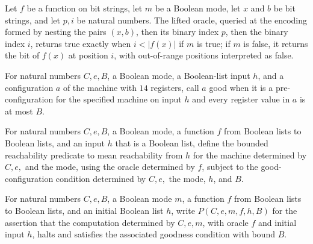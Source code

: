\begin{lemma}
\label{Complexity.comp_lifted}
\leanok
{}
Let $f$ be a function on bit strings, let $m$ be a Boolean mode, let $x$ and $b$ be bit
strings, and let $p,i$ be natural numbers. The lifted oracle, queried at the encoding
formed by nesting the pairs $(x,b)$, then its binary index $p$, then the binary index
$i$, returns true exactly when $i<|f(x)|$ if $m$ is true; if $m$ is false, it returns
the bit of $f(x)$ at position $i$, with out-of-range positions interpreted as false.
\end{lemma}

\begin{definition}
\label{Complexity.CompGood}
\leanok
{}
For natural numbers $C,e,B$, a Boolean mode, a Boolean-list input $h$, and a
configuration $a$ of the machine with $14$ registers, call $a$ good when it is a
pre-configuration for the specified machine on input $h$ and every register value in $a$
is at most $B$.
\end{definition}

\begin{definition}
\label{Complexity.CompReach}
\leanok
{}
For natural numbers $C,e,B$, a Boolean mode, a function $f$ from Boolean lists to
Boolean lists, and an input $h$ that is a Boolean list, define the bounded reachability
predicate to mean reachability from $h$ for the machine determined by $C,e,$ and the
mode, using the oracle determined by $f$, subject to the good-configuration condition
determined by $C,e,$ the mode, $h$, and $B$.
\end{definition}

\begin{definition}
\label{Complexity.CompHalt}
\leanok
{}
For natural numbers $C,e,B$, a Boolean mode $m$, a function $f$ from Boolean lists to
Boolean lists, and an initial Boolean list $h$, write $P(C,e,m,f,h,B)$ for the assertion
that the computation determined by $C,e,m$, with oracle $f$ and initial input $h$, halts
and satisfies the associated goodness condition with bound $B$.
\end{definition}

